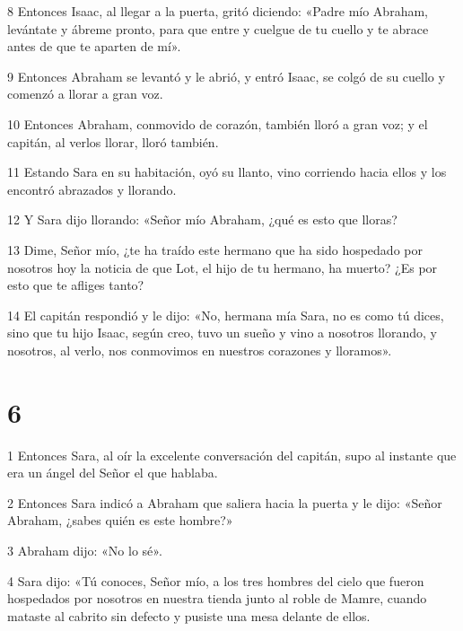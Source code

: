 \par 8 Entonces Isaac, al llegar a la puerta, gritó diciendo: «Padre mío Abraham, levántate y ábreme pronto, para que entre y cuelgue de tu cuello y te abrace antes de que te aparten de mí».

\par 9 Entonces Abraham se levantó y le abrió, y entró Isaac, se colgó de su cuello y comenzó a llorar a gran voz.

\par 10 Entonces Abraham, conmovido de corazón, también lloró a gran voz; y el capitán, al verlos llorar, lloró también.

\par 11 Estando Sara en su habitación, oyó su llanto, vino corriendo hacia ellos y los encontró abrazados y llorando.

\par 12 Y Sara dijo llorando: «Señor mío Abraham, ¿qué es esto que lloras?

\par 13 Dime, Señor mío, ¿te ha traído este hermano que ha sido hospedado por nosotros hoy la noticia de que Lot, el hijo de tu hermano, ha muerto? ¿Es por esto que te afliges tanto?

\par 14 El capitán respondió y le dijo: «No, hermana mía Sara, no es como tú dices, sino que tu hijo Isaac, según creo, tuvo un sueño y vino a nosotros llorando, y nosotros, al verlo, nos conmovimos en nuestros corazones y lloramos».

\chapter{6}

\par 1 Entonces Sara, al oír la excelente conversación del capitán, supo al instante que era un ángel del Señor el que hablaba.

\par 2 Entonces Sara indicó a Abraham que saliera hacia la puerta y le dijo: «Señor Abraham, ¿sabes quién es este hombre?»

\par 3 Abraham dijo: «No lo sé».

\par 4 Sara dijo: «Tú conoces, Señor mío, a los tres hombres del cielo que fueron hospedados por nosotros en nuestra tienda junto al roble de Mamre, cuando mataste al cabrito sin defecto y pusiste una mesa delante de ellos.

